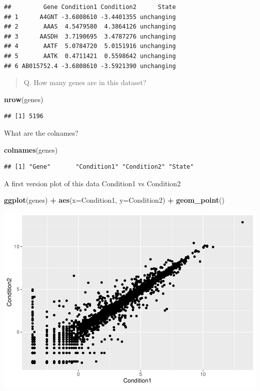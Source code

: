 \documentclass[
]{article}
\newenvironment{Shaded}{\begin{snugshade}}{\end{snugshade}}
\newcommand{\DataTypeTok}[1]{\textcolor[rgb]{0.13,0.29,0.53}{#1}}
\newcommand{\KeywordTok}[1]{\textcolor[rgb]{0.13,0.29,0.53}{\textbf{#1}}}
\newcommand{\NormalTok}[1]{#1}
\newcommand{\OperatorTok}[1]{\textcolor[rgb]{0.81,0.36,0.00}{\textbf{#1}}}
\newcommand{\StringTok}[1]{\textcolor[rgb]{0.31,0.60,0.02}{#1}}
\begin{document}
\begin{verbatim}
##         Gene Condition1 Condition2      State
## 1      A4GNT -3.6808610 -3.4401355 unchanging
## 2       AAAS  4.5479580  4.3864126 unchanging
## 3      AASDH  3.7190695  3.4787276 unchanging
## 4       AATF  5.0784720  5.0151916 unchanging
## 5       AATK  0.4711421  0.5598642 unchanging
## 6 AB015752.4 -3.6808610 -3.5921390 unchanging
\end{verbatim}

\begin{quote}
Q. How many genes are in this dataset?
\end{quote}

\begin{Shaded}
\begin{Highlighting}[]
\KeywordTok{nrow}\NormalTok{(genes)}
\end{Highlighting}
\end{Shaded}

\begin{verbatim}
## [1] 5196
\end{verbatim}

What are the colnames?

\begin{Shaded}
\begin{Highlighting}[]
\KeywordTok{colnames}\NormalTok{(genes)}
\end{Highlighting}
\end{Shaded}

\begin{verbatim}
## [1] "Gene"       "Condition1" "Condition2" "State"
\end{verbatim}

A first version plot of this data Condition1 vs Condition2

\begin{Shaded}
\begin{Highlighting}[]
\KeywordTok{ggplot}\NormalTok{(genes) }\OperatorTok{+}
\StringTok{  }\KeywordTok{aes}\NormalTok{(}\DataTypeTok{x=}\NormalTok{Condition1, }\DataTypeTok{y=}\NormalTok{Condition2) }\OperatorTok{+}\StringTok{ }
\StringTok{  }\KeywordTok{geom_point}\NormalTok{()}
\end{Highlighting}
\end{Shaded}

\includegraphics{class05_files/figure-latex/unnamed-chunk-8-1.pdf}
\end{document}
